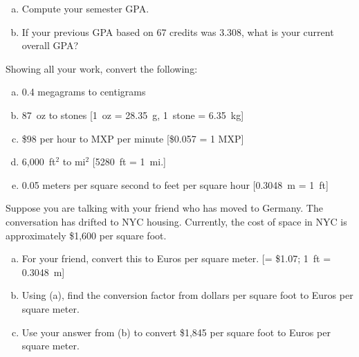 \documentclass[11pt,letterpaper]{article}
\begin{document}
\begin{enumerate}[(a)]
\item Compute your semester GPA. 
\item If your previous GPA based on 67 credits was 3.308, what is your current overall GPA?
\end{enumerate}



\newpage



 Showing all your work, convert the following:
	\begin{enumerate}[(a)]
	\item 0.4 megagrams to centigrams
	\item 87~oz to stones [1~oz = 28.35~g, 1~stone = 6.35~kg]
	\item \$98 per hour to MXP per minute [\$0.057 = 1 MXP]
	\item 6,000~ft$^2$ to mi$^2$ [5280~ft = 1~mi.]
	\item 0.05 meters per square second to feet per square hour [0.3048~m = 1~ft]
	\end{enumerate}



\newpage



 Suppose you are talking with your friend who has moved to Germany. The conversation has drifted to NYC housing. Currently, the cost of space in NYC is approximately \$1,600 per square foot. 
	\begin{enumerate}[(a)]
	\item For your friend, convert this to Euros per square meter. [= \$1.07; 1~ft = 0.3048~m]
	\item Using (a), find the conversion factor from dollars per square foot to Euros per square meter. 
	\item Use your answer from (b) to convert \$1,845 per square foot to Euros per square meter. 
	\end{enumerate}
\end{document}
